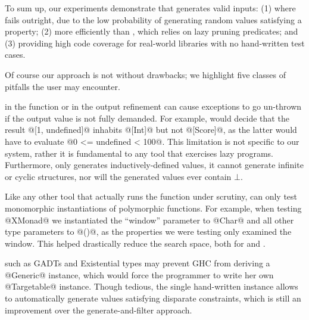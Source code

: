 To sum up, our experiments demonstrate that \toolname generates valid inputs:
%
(1) where \quickcheck fails outright, due to the low probability of
    generating random values satisfying a property;
%
(2) more efficiently than \lazysmallcheck, which relies on lazy
    pruning predicates; and
%
(3) providing high code coverage for real-world libraries with no
    hand-written test cases.


Of course our approach is not without drawbacks; we highlight five classes
of pitfalls the user may encounter.

 in the function or in the output refinement can cause exceptions
  to go un-thrown if the output value is not fully demanded. For example,
  \toolname would decide that the result @[1, undefined]@ inhabits @[Int]@ but not
  @[Score]@, as the latter would have to evaluate @0 <= undefined < 100@. This
  limitation is not specific to our system, rather it is fundamental to any tool
  that exercises lazy programs. Furthermore, \toolname only generates
  inductively-defined values, it cannot generate infinite or cyclic structures,
  nor will the generated values ever contain $\bot$.

 Like any other tool that actually runs the function under scrutiny,
  \toolname can only test monomorphic instantiations of polymorphic
  functions. For example, when testing @XMonad@ we instantiated the ``window''
  parameter to @Char@ and all other type parameters to @()@, as the properties
  we were testing only examined the window. This helped drastically reduce the
  search space, both for \toolname and \smallcheck.


 such as GADTs and Existential types
  may prevent GHC from deriving a @Generic@ instance, which would force the
  programmer to write her own @Targetable@ instance. Though tedious, the single
  hand-written instance allows \toolname to automatically generate values
  satisfying disparate constraints, which is still an improvement over the
  generate-and-filter approach.
  
